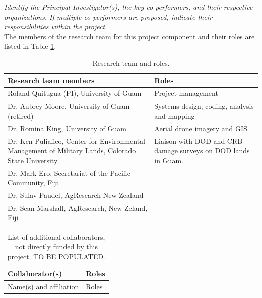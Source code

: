 \documentclass[11pt,english,letterpaper]{scrartcl}
\begin{document}
\textit{Identify the Principal Investigator(s), the key co-performers, and their respective organizations. If multiple co-performers are proposed, indicate their responsibilities within the project.}\\

The members of the research team for this project component and their roles are listed in Table \ref{tbl:team}.

\begin{table}[h]
	\centering
	\caption{Research team and roles.}	
	
	\begin{tabular}{p{2.2in}p{4in}}
		\toprule
		\textbf{Research team members} & \textbf{Roles} \\ \midrule
		
		Roland Quitugua (PI), University of Guam & Project management \\ \midrule
		
		Dr. Aubrey Moore, University of Guam (retired) & Systems design, coding, analysis and mapping \\ \midrule
		
		Dr. Romina King, University of Guam & Aerial drone imagery and GIS \\ \midrule
		
		Dr. Ken Puliafico, Center for Environmental Management of Military Lands, Colorado State University & Liaison with DOD and CRB damage surveys on DOD lands in Guam. \\ \midrule
		
		Dr. Mark Ero, Secretariat of the Pacific Community, Fiji & \\ \midrule
		
		Dr. Sulav Paudel, AgResearch New Zealand & \\ \midrule
		
		Dr. Sean Marshall, AgResearch, New Zeland, Fiji & \\ \bottomrule	
		
	\end{tabular}
	\label{tbl:team}
	
\end{table}

\begin{table}[h]
	\centering
	\caption{List of additional collaborators, not directly funded by this project. TO BE POPULATED.}	
	
	\begin{tabular}{p{2.2in}p{4in}}
		\toprule
		\textbf{Collaborator(s)} & \textbf{Roles} \\ \midrule
		
		Name(s) and affiliation & Roles \\ \midrule
				
	\end{tabular}
	\label{tbl:team-additional}	
\end{table}
\end{document}
